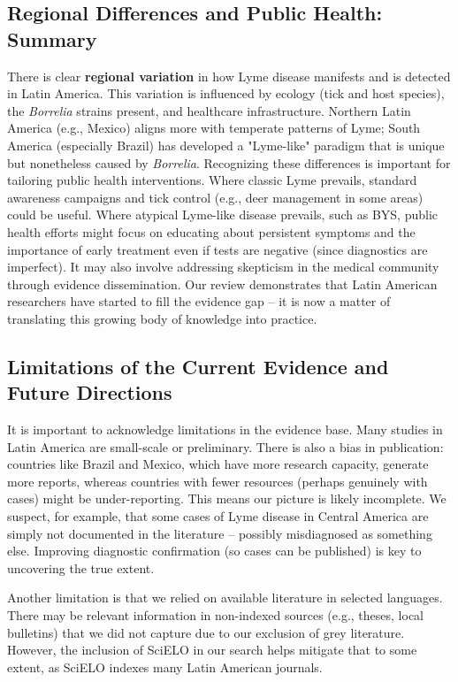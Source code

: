 \documentclass[11pt,letterpaper]{article}
\begin{document}
\subsection{Regional Differences and Public Health: Summary}
There is clear \textbf{regional variation} in how Lyme disease manifests and is detected in Latin America. This variation is influenced by ecology (tick and host species), the \textit{Borrelia} strains present, and healthcare infrastructure. Northern Latin America (e.g., Mexico) aligns more with temperate patterns of Lyme; South America (especially Brazil) has developed a "Lyme-like" paradigm that is unique but nonetheless caused by \textit{Borrelia}. Recognizing these differences is important for tailoring public health interventions. Where classic Lyme prevails, standard awareness campaigns and tick control (e.g., deer management in some areas) could be useful. Where atypical Lyme-like disease prevails, such as BYS, public health efforts might focus on educating about persistent symptoms and the importance of early treatment even if tests are negative (since diagnostics are imperfect). It may also involve addressing skepticism in the medical community through evidence dissemination. Our review demonstrates that Latin American researchers have started to fill the evidence gap – it is now a matter of translating this growing body of knowledge into practice.

\subsection{Limitations of the Current Evidence and Future Directions}
It is important to acknowledge limitations in the evidence base. Many studies in Latin America are small-scale or preliminary. There is also a bias in publication: countries like Brazil and Mexico, which have more research capacity, generate more reports, whereas countries with fewer resources (perhaps genuinely with cases) might be under-reporting. This means our picture is likely incomplete. We suspect, for example, that some cases of Lyme disease in Central America are simply not documented in the literature – possibly misdiagnosed as something else. Improving diagnostic confirmation (so cases can be published) is key to uncovering the true extent.

Another limitation is that we relied on available literature in selected languages. There may be relevant information in non-indexed sources (e.g., theses, local bulletins) that we did not capture due to our exclusion of grey literature. However, the inclusion of SciELO in our search helps mitigate that to some extent, as SciELO indexes many Latin American journals.
\end{document}
